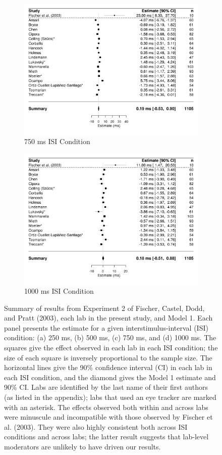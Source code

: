 \documentclass[man,floatsintext]{apa6}
\theoremstyle{definition}
\theoremstyle{definition}
\theoremstyle{definition}
\theoremstyle{remark}
\begin{document}
\begin{figure}[H]
\begin{subfigure}{.5\textwidth}
        \includegraphics[]{d750}
        \caption{750 ms ISI Condition}
    \end{subfigure}
    \begin{subfigure}{.5\textwidth}
        \includegraphics[]{d1000}
        \caption{1000 ms ISI Condition}
    \end{subfigure}
    \caption{Summary of results from Experiment 2 of Fischer, Castel, Dodd, and Pratt (2003), each lab in the present study, and Model 1. Each panel presents the estimate for a given interstimulus-interval (ISI) condition: (a) 250 ms, (b) 500 ms, (c) 750 ms, and (d) 1000 ms. The squares give the effect observed in each lab in each ISI condition; the size of each square is inversely proportional to the sample size. The horizontal lines give the 90\% confidence interval (CI) in each lab in each ISI condition, and the diamond gives the Model 1 estimate and 90\% CI. Labs are identified by the last name of their first authors (as listed in the appendix); labs that used an eye tracker are marked with an asterisk. The effects observed both within and across labs were minuscule and incompatible with those observed by Fischer et al. (2003). They were also highly consistent both across ISI conditions and across labs; the latter result suggests that lab-level moderators are unlikely to have driven our results.}\label{fig:model1}
\end{figure}
\end{document}
